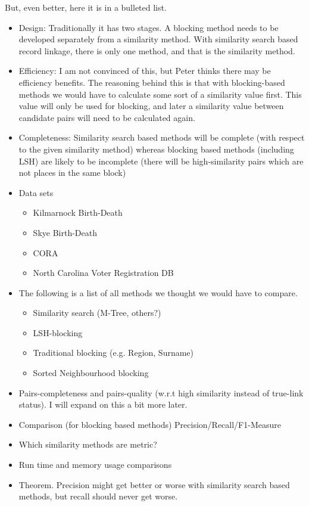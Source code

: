 \documentclass{llncs}
\begin{document}
\vspace{5mm}

But, even better, here it is in a bulleted list.

\begin{itemize}
\item Design: Traditionally it has two stages. A blocking method needs to be developed separately from a similarity method. With similarity search based record linkage, there is only one method, and that is the similarity method.
\item Efficiency: I am not convinced of this, but Peter thinks there may be efficiency benefits. The reasoning behind this is that with blocking-based methods we would have to calculate some sort of a similarity value first. This value will only be used for blocking, and later a similarity value between candidate pairs will need to be calculated again.
\item Completeness: Similarity search based methods will be complete (with respect to the given similarity method) whereas blocking based methods (including LSH) are likely to be incomplete (there will be high-similarity pairs which are not places in the same block)
\item Data sets
\begin{itemize}
\item Kilmarnock Birth-Death
\item Skye Birth-Death
\item CORA
\item North Carolina Voter Registration DB
\end{itemize}
\item The following is a list of all methods we thought we would have to compare.
\begin{itemize}
\item Similarity search (M-Tree, others?)
\item LSH-blocking
\item Traditional blocking (e.g. Region, Surname)
\item Sorted Neighbourhood blocking
\end{itemize}
\item Pairs-completeness and pairs-quality (w.r.t high similarity instead of true-link status). I will expand on this a bit more later.
\item Comparison (for blocking based methods)
		Precision/Recall/F1-Measure
\item Which similarity methods are metric?
\item Run time and memory usage comparisons
\item Theorem. Precision might get better or worse with similarity search based methods, but recall should never get worse.
\end{itemize}
\end{document}
